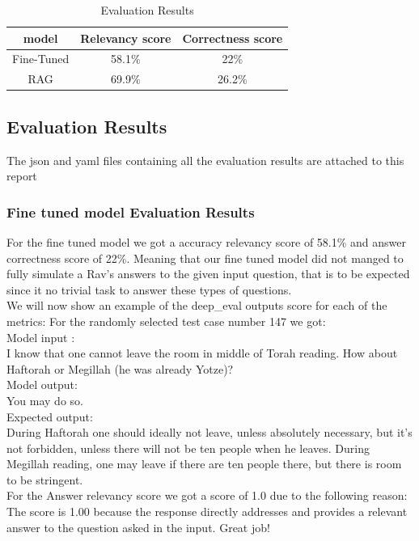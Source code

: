 \documentclass[11pt]{article}
\begin{document}
\begin{table}[htbp]
    \centering
    \caption{Evaluation Results}
    \label{tab:example}
    \begin{tabular}{ccc}
        \toprule
        model & Relevancy score & Correctness score   \\
        \midrule
        
        Fine-Tuned & 58.1\% & 22\%  \\
        RAG & 69.9\% & 26.2\% \\
        \bottomrule
    \end{tabular}
\end{table}

\subsection{Evaluation Results}
The json and yaml files containing all the evaluation results are attached to this report
\subsubsection{Fine tuned model Evaluation Results}
For the fine tuned model we got a accuracy relevancy score of 58.1\% and answer correctness score of 22\%.
Meaning that our fine tuned model did not manged to fully simulate a Rav's answers to the given input question, that is to be expected since it no trivial task to answer these types of questions.\\
We will now show an example of the deep\_eval outputs score for each of the metrics:
For the randomly selected test case number 147 we got:\\
Model input :\\
 I know that one cannot leave the room in middle of Torah reading. How about Haftorah or Megillah (he was already Yotze)?\\
Model output:\\

You may do so. \\

Expected output: \\

During Haftorah one should ideally not leave, unless absolutely necessary, but it’s not forbidden, unless there will not be ten people when he leaves.
During Megillah reading, one may leave if there are ten people there, but there is room to be stringent. \\

For the Answer relevancy score we got a score of 1.0 due to the following reason: \\
The score is 1.00 because the response directly addresses and provides a relevant answer to the question asked in the input. Great job!\\
\end{document}
